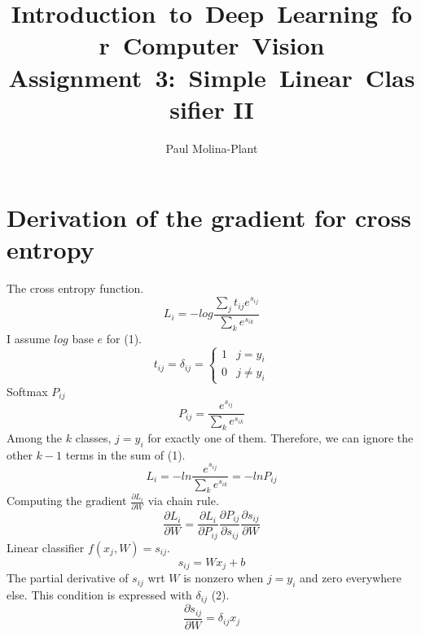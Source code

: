 \documentclass[12pt, letter]{article}
\newcommand{\courseName}{Introduction~to~Deep~Learning~for~Computer~Vision}
\newcommand{\assignName}{Assignment~3:~Simple~Linear~Classifier II}
\begin{document}
\pagestyle{titlesec_assignment}

\title{\courseName\\\assignName}
\author{Paul Molina-Plant}
\maketitle


\pagebreak

\section{Derivation of the gradient for cross entropy}
The cross entropy function.
\begin{equation}
  L_i = - log \frac{\sum_jt_{ij}e^{s_{ij}}}{\sum_ke^{s_{ik}}}
\end{equation}
I assume $log$ base $e$ for (1).
\begin{equation}
  t_{ij} = \delta_{ij} =
  \begin{cases}
    1 & j = y_i \\
    0 & j \ne y_i
  \end{cases}
\end{equation}
Softmax $P_{ij}$
\begin{equation}
  P_{ij} = \frac{e^{s_{ij}}}{\sum_{k}e^{s_{ik}}}
\end{equation}
Among the $k$ classes, $j = y_{i}$ for exactly one of them. Therefore, we can
ignore the other $k-1$ terms in the sum of (1).
\begin{equation}
  L_i = - ln \frac{e^{s_{ij}}}{\sum_k{e^{s_{ik}}}} = -ln P_{ij}
\end{equation}
Computing the gradient $\frac{\partial L_i}{\partial W}$ via chain rule.
\begin{equation}\nonumber
  \frac{\partial L_i}{\partial W} =
  \frac{\partial L_i}{\partial P_{ij}} \frac{\partial P_{ij}}{\partial s_{ij}} \frac{\partial s_{ij}}{\partial W}
\end{equation}
Linear classifier $f(x_j, W) = s_{ij}$.
\begin{equation}
  s_{ij} = Wx_j + b
\end{equation}
The partial derivative of $s_{ij}$ wrt $W$ is nonzero when $j=y_i$
and zero everywhere else. This condition is expressed with $\delta_{ij}$ (2).
\begin{equation}\nonumber
  \frac{\partial s_{ij}}{\partial W} = \delta_{ij} x_j
\end{equation}
\end{document}
